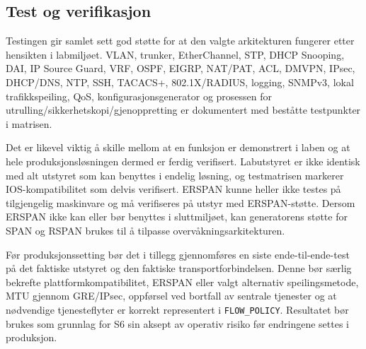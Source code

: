\subsection{Test og verifikasjon}

Testingen gir samlet sett god støtte for at den valgte arkitekturen fungerer etter hensikten i labmiljøet. VLAN, trunker, EtherChannel, STP, DHCP Snooping, DAI, IP Source Guard, VRF, OSPF, EIGRP, NAT/PAT, ACL, DMVPN, IPsec, DHCP/DNS, NTP, SSH, TACACS+, 802.1X/RADIUS, logging, SNMPv3, lokal trafikkspeiling, QoS, konfigurasjonsgenerator og prosessen for utrulling/sikkerhetskopi/gjenoppretting er dokumentert med beståtte testpunkter i matrisen.

Det er likevel viktig å skille mellom at en funksjon er demonstrert i laben og at hele produksjonsløsningen dermed er ferdig verifisert. Labutstyret er ikke identisk med alt utstyret som kan benyttes i endelig løsning, og testmatrisen markerer IOS-kompatibilitet som delvis verifisert. ERSPAN kunne heller ikke testes på tilgjengelig maskinvare og må verifiseres på utstyr med ERSPAN-støtte. Dersom ERSPAN ikke kan eller bør benyttes i sluttmiljøet, kan generatorens støtte for SPAN og RSPAN brukes til å tilpasse overvåkningsarkitekturen.

Før produksjonssetting bør det i tillegg gjennomføres en siste ende-til-ende-test på det faktiske utstyret og den faktiske transportforbindelsen. Denne bør særlig bekrefte plattformkompatibilitet, ERSPAN eller valgt alternativ speilingsmetode, MTU gjennom GRE/IPsec, oppførsel ved bortfall av sentrale tjenester og at nødvendige tjenesteflyter er korrekt representert i \texttt{FLOW\_POLICY}. Resultatet bør brukes som grunnlag for S6 sin aksept av operativ risiko før endringene settes i produksjon.
